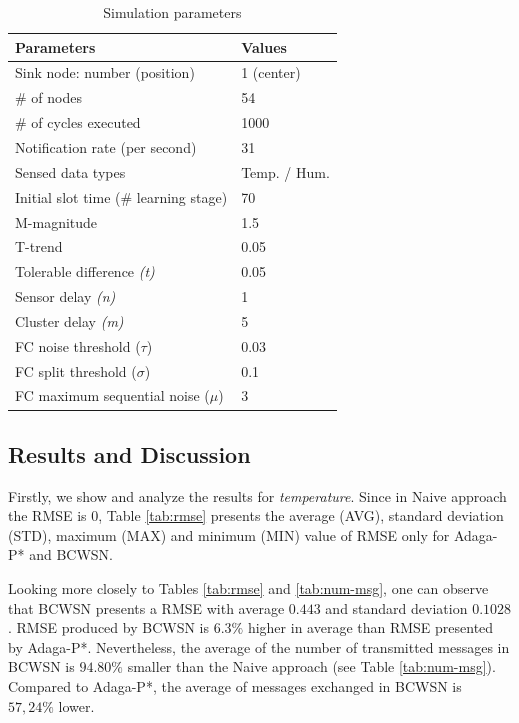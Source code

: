 \documentclass{acm_proc_article-sp}
\begin{document}
\begin{table}[h!]
\tiny 
\caption{Simulation parameters}
\label{tab:parameters}
\begin{center}
\begin{tabular}{|l||l|}
\hline
Parameters &Values\\
\hline\hline
Sink node: number (position) &1 (center) \\
\hline
\# of nodes &54 \\
\hline
\# of cycles executed &1000 \\
\hline
Notification rate (per second) &31 \\
\hline
Sensed data types &Temp. / Hum. \\
\hline
Initial slot time (\# learning stage) &70 \\
\hline
M-magnitude &1.5 \\
\hline
T-trend &0.05 \\
\hline
Tolerable difference {\it(t)} &0.05 \\
\hline
Sensor delay {\it(n)} &1 \\
\hline
Cluster delay {\it(m)} &5 \\
\hline
FC noise threshold ($\tau$) &0.03 \\
\hline
FC split threshold ($\sigma$) &0.1 \\
\hline
FC maximum sequential noise ($\mu$) &3 \\
\hline
\end{tabular}
\end{center}
\end{table}
\vspace*{-.3cm}


\subsection{Results and Discussion}
\label{results-and-discussion}

Firstly, we show and analyze the results for {\it temperature}. Since in Naive approach the RMSE is $0$, Table \ref{tab:rmse} presents 
the average (AVG), standard deviation (STD),
maximum (MAX) and minimum (MIN) value of RMSE only for Adaga-P* and BCWSN.
\vspace*{-.3cm}

Looking more closely to Tables \ref{tab:rmse} and \ref{tab:num-msg}, one can observe that BCWSN
presents a RMSE with average $0.443$ and standard deviation $0.1028$. RMSE produced by BCWSN is
$6.3\%$ higher in average than RMSE presented by Adaga-P*. Nevertheless, 
the average of the number of transmitted messages in BCWSN is $94.80\%$ smaller than the Naive
approach (see Table \ref{tab:num-msg}). Compared to Adaga-P*, the average of
messages exchanged in BCWSN is $57,24\%$ lower.
\vspace*{-.3cm}
\end{document}
